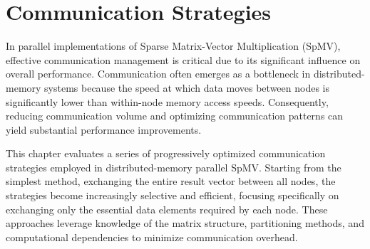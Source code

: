 \chapter{Communication Strategies}



In parallel implementations of Sparse Matrix-Vector Multiplication (SpMV), effective communication management is critical due to its significant influence on overall performance. Communication often emerges as a bottleneck in distributed-memory systems because the speed at which data moves between nodes is significantly lower than within-node memory access speeds. Consequently, reducing communication volume and optimizing communication patterns can yield substantial performance improvements.
\medskip

This chapter evaluates a series of progressively optimized communication strategies employed in distributed-memory parallel SpMV. Starting from the simplest method, exchanging the entire result vector between all nodes, the strategies become increasingly selective and efficient, focusing specifically on exchanging only the essential data elements required by each node. These approaches leverage knowledge of the matrix structure, partitioning methods, and computational dependencies to minimize communication overhead.
\medskip




